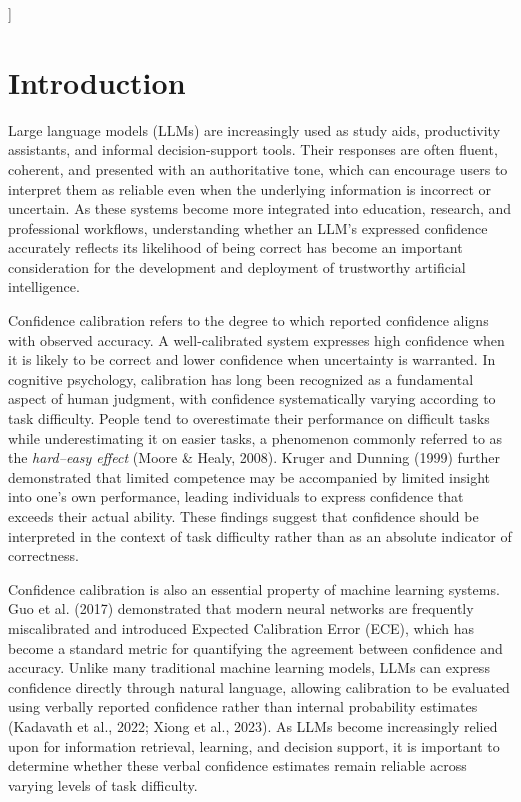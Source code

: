 \documentclass[twoside,twocolumn,10pt]{article}
\begin{document}
]

\section{Introduction}

\fontsize{12}{14}\selectfont

Large language models (LLMs) are increasingly used as study aids, productivity assistants, and informal decision-support tools. Their responses are often fluent, coherent, and presented with an authoritative tone, which can encourage users to interpret them as reliable even when the underlying information is incorrect or uncertain. As these systems become more integrated into education, research, and professional workflows, understanding whether an LLM's expressed confidence accurately reflects its likelihood of being correct has become an important consideration for the development and deployment of trustworthy artificial intelligence.

Confidence calibration refers to the degree to which reported confidence aligns with observed accuracy. A well-calibrated system expresses high confidence when it is likely to be correct and lower confidence when uncertainty is warranted. In cognitive psychology, calibration has long been recognized as a fundamental aspect of human judgment, with confidence systematically varying according to task difficulty. People tend to overestimate their performance on difficult tasks while underestimating it on easier tasks, a phenomenon commonly referred to as the \textit{hard--easy effect} (Moore \& Healy, 2008). Kruger and Dunning (1999) further demonstrated that limited competence may be accompanied by limited insight into one's own performance, leading individuals to express confidence that exceeds their actual ability. These findings suggest that confidence should be interpreted in the context of task difficulty rather than as an absolute indicator of correctness.

Confidence calibration is also an essential property of machine learning systems. Guo et al. (2017) demonstrated that modern neural networks are frequently miscalibrated and introduced Expected Calibration Error (ECE), which has become a standard metric for quantifying the agreement between confidence and accuracy. Unlike many traditional machine learning models, LLMs can express confidence directly through natural language, allowing calibration to be evaluated using verbally reported confidence rather than internal probability estimates (Kadavath et al., 2022; Xiong et al., 2023). As LLMs become increasingly relied upon for information retrieval, learning, and decision support, it is important to determine whether these verbal confidence estimates remain reliable across varying levels of task difficulty.
\end{document}

